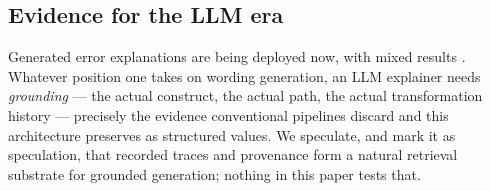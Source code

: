 \subsection{Evidence for the LLM era}

Generated error explanations are being deployed now, with mixed
results \cite{taylor2024dcc,santos2024silver}. Whatever position one takes on wording generation,
an LLM explainer needs \emph{grounding} --- the actual construct, the
actual path, the actual transformation history --- precisely the
evidence conventional pipelines discard and this architecture
preserves as structured values. We speculate, and mark it as
speculation, that recorded traces and provenance form a natural
retrieval substrate for grounded generation; nothing in this paper
tests that.



